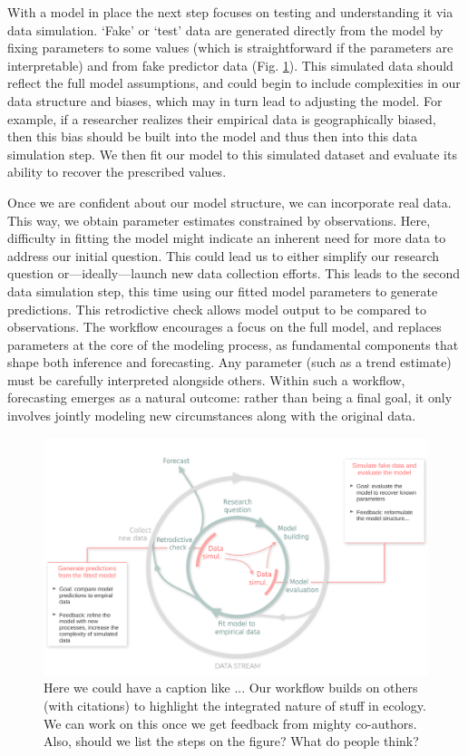 \documentclass[11pt]{article}
\begin{document}
With a model in place the next step focuses on testing and understanding it via data simulation. `Fake' or `test' data are generated directly from the model by fixing parameters to some values (which is straightforward if the parameters are interpretable) and from fake predictor data (Fig. \ref{fig:workflowy}). This simulated data should reflect the full model assumptions, and could begin to include complexities in our data structure and biases, which may in turn lead to adjusting the model. For example, if a researcher realizes their empirical data is geographically biased, then this bias should be built into the model and thus then into this data simulation step. We then fit our model to this simulated dataset and evaluate its ability to recover the prescribed values. 

Once we are confident about our model structure, we can incorporate real data. This way, we obtain parameter estimates constrained by observations. Here, difficulty in fitting the model might indicate an inherent need for more data to address our initial question. This could lead us to either simplify our research question or---ideally---launch new data collection efforts. This leads to the second data simulation step, this time using our fitted model parameters to generate predictions. This retrodictive check allows model output to be compared to observations. 
The workflow encourages a focus on the full model, and replaces parameters at the core of the modeling process, as fundamental components that shape both inference and forecasting. Any parameter (such as a trend estimate) must be carefully interpreted alongside others. %
Within such a workflow, forecasting emerges as a natural outcome: rather than being a final goal, it only involves jointly modeling new circumstances along with the original data.

\begin{figure}[h]
	\centering
    \hspace*{-1.5cm}
	\includegraphics{figures/figure_worflow}
	\caption{Here we could have a caption like ... Our workflow builds on others (with citations) to highlight the integrated nature of stuff in ecology. We can work on this once we get feedback from mighty co-authors. Also, should we list the steps on the figure? What do people think?} 
	\label{fig:workflowy}
\end{figure}
\end{document}
